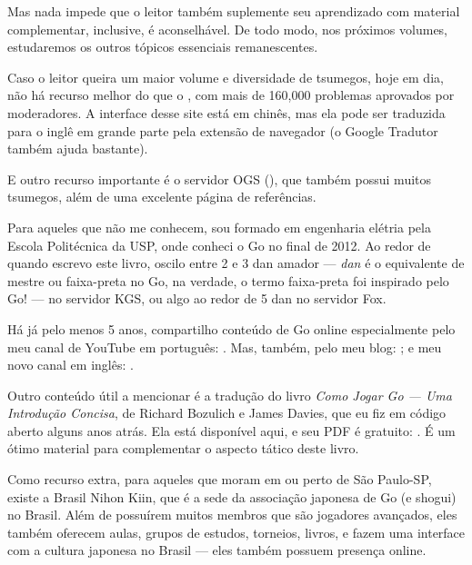 Mas nada impede que o leitor também suplemente seu aprendizado com material complementar, inclusive, é aconselhável. De todo modo, nos próximos volumes, estudaremos os outros tópicos essenciais remanescentes.

Caso o leitor queira um maior volume e diversidade de tsumegos, hoje em dia, não há recurso melhor do que o , com mais de 160,000 problemas aprovados por moderadores. A interface desse site está em chinês, mas ela pode ser traduzida para o inglê em grande parte pela extensão de navegador  (o Google Tradutor também ajuda bastante).

E outro recurso importante é o servidor OGS (), que também possui muitos tsumegos, além de uma excelente página de referências.

\bigskip
\bigskip

Para aqueles que não me conhecem, sou formado em engenharia elétria pela Escola Politécnica da USP, onde conheci o Go no final de 2012. Ao redor de quando escrevo este livro, oscilo entre 2 e 3 dan amador --- \emph{dan} é o equivalente de mestre ou faixa-preta no Go, na verdade, o termo faixa-preta foi inspirado pelo Go! --- no servidor KGS, ou algo ao redor de 5 dan no servidor Fox.

Há já pelo menos 5 anos, compartilho conteúdo de Go online especialmente pelo meu canal de YouTube em português: . Mas, também, pelo meu blog: ; e meu novo canal em inglês: .

Outro conteúdo útil a mencionar é a tradução do livro \emph{Como Jogar Go --- Uma Introdução Concisa}, de Richard Bozulich e James Davies, que eu fiz em código aberto alguns anos atrás. Ela está disponível aqui, e seu PDF é gratuito: . É um ótimo material para complementar o aspecto tático deste livro.

Como recurso extra, para aqueles que moram em ou perto de São Paulo-SP, existe a Brasil Nihon Kiin, que é a sede da associação japonesa de Go (e shogui) no Brasil. Além de possuírem muitos membros que são jogadores avançados, eles também oferecem aulas, grupos de estudos, torneios, livros, e fazem uma interface com a cultura japonesa no Brasil --- eles também possuem presença online.


